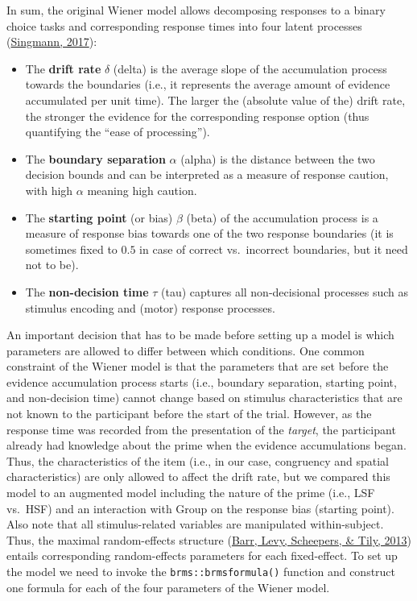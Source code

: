 \documentclass[
  11pt,
  english,
  ,doc,floatsintext]{apa6}
\begin{document}
In sum, the original Wiener model allows decomposing responses to a binary choice tasks and corresponding response times into four latent processes (\protect\hyperlink{ref-singmann_diffusionux2fwiener_2017}{Singmann, 2017}):

\begin{itemize}
\item
  The \textbf{drift rate} \(\delta\) (delta) is the average slope of the accumulation process towards the boundaries (i.e., it represents the average amount of evidence accumulated per unit time). The larger the (absolute value of the) drift rate, the stronger the evidence for the corresponding response option (thus quantifying the ``ease of processing'').
\item
  The \textbf{boundary separation} \(\alpha\) (alpha) is the distance between the two decision bounds and can be interpreted as a measure of response caution, with high \(\alpha\) meaning high caution.
\item
  The \textbf{starting point} (or bias) \(\beta\) (beta) of the accumulation process is a measure of response bias towards one of the two response boundaries (it is sometimes fixed to \(0.5\) in case of correct vs.~incorrect boundaries, but it need not to be).
\item
  The \textbf{non-decision time} \(\tau\) (tau) captures all non-decisional processes such as stimulus encoding and (motor) response processes.
\end{itemize}

An important decision that has to be made before setting up a model is which parameters are allowed to differ between which conditions. One common constraint of the Wiener model is that the parameters that are set before the evidence accumulation process starts (i.e., boundary separation, starting point, and non-decision time) cannot change based on stimulus characteristics that are not known to the participant before the start of the trial. However, as the response time was recorded from the presentation of the \emph{target}, the participant already had knowledge about the prime when the evidence accumulations began. Thus, the characteristics of the item (i.e., in our case, congruency and spatial characteristics) are only allowed to affect the drift rate, but we compared this model to an augmented model including the nature of the prime (i.e., LSF vs.~HSF) and an interaction with Group on the response bias (starting point). Also note that all stimulus-related variables are manipulated within-subject. Thus, the maximal random-effects structure (\protect\hyperlink{ref-barr_random_2013-1}{Barr, Levy, Scheepers, \& Tily, 2013}) entails corresponding random-effects parameters for each fixed-effect. To set up the model we need to invoke the \texttt{brms::brmsformula()} function and construct one formula for each of the four parameters of the Wiener model.
\end{document}
